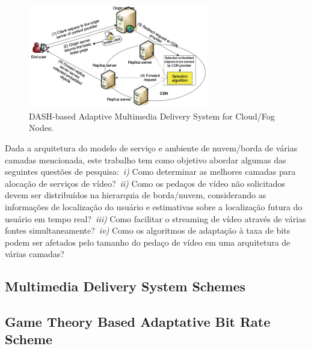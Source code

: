 \vspace{0.8cm}
\begin{figure}[htpb]
	\centering
	\includegraphics[width=0.7\textwidth]{img/fig-intro.png}
	\caption{DASH-based Adaptive Multimedia Delivery System for Cloud/Fog Nodes.}
	\label{fig:scenario-arch}
\end{figure}

Dada a arquitetura do modelo de serviço e ambiente de nuvem/borda de várias camadas mencionada, este trabalho tem como objetivo abordar algumas das seguintes questões de pesquisa:~\textit{i)} Como determinar as melhores camadas para alocação de serviços de vídeo?~\textit{ii)} Como os pedaços de vídeo não solicitados devem ser distribuídos na hierarquia de borda/nuvem, considerando as informações de localização do usuário e estimativas sobre a localização futura do usuário em tempo real?~\textit{iii)} Como facilitar o streaming de vídeo através de várias fontes simultaneamente?~\textit{iv)} Como os algoritmos de adaptação à taxa de bits podem ser afetados pelo tamanho do pedaço de vídeo em uma arquitetura de várias camadas?

\subsection{Multimedia Delivery System Schemes}

\subsection{Game Theory Based Adaptative Bit Rate Scheme}


